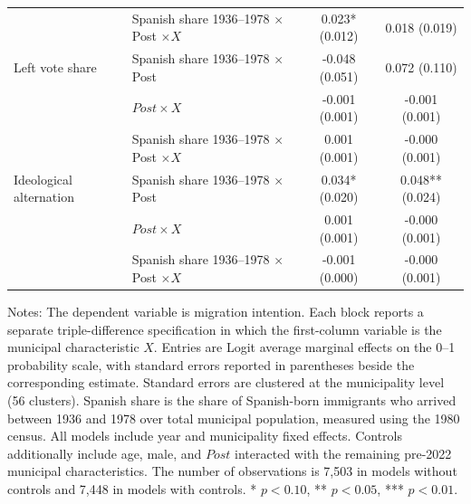 \begin{table}[!htbp]
\begin{tabular}{llcc}
 & Spanish share 1936--1978 \(\times\) Post \(\times X\) & 0.023* (0.012) & 0.018 (0.019) \\
\addlinespace
Left vote share & Spanish share 1936--1978 \(\times\) Post & -0.048 (0.051) & 0.072 (0.110) \\
 & \(Post \times X\) & -0.001 (0.001) & -0.001 (0.001) \\
 & Spanish share 1936--1978 \(\times\) Post \(\times X\) & 0.001 (0.001) & -0.000 (0.001) \\
\addlinespace
Ideological alternation & Spanish share 1936--1978 \(\times\) Post & 0.034* (0.020) & 0.048** (0.024) \\
 & \(Post \times X\) & 0.001 (0.001) & -0.000 (0.001) \\
 & Spanish share 1936--1978 \(\times\) Post \(\times X\) & -0.001 (0.000) & -0.000 (0.001) \\
\hline
\end{tabular}
\par\vspace{1.5mm}
\begin{minipage}{0.98\linewidth}
\footnotesize\setlength{\parindent}{0pt}\setlength{\parskip}{1pt}
Notes: The dependent variable is migration intention. Each block reports a separate triple-difference specification in which the first-column variable is the municipal characteristic \(X\). Entries are Logit average marginal effects on the 0--1 probability scale, with standard errors reported in parentheses beside the corresponding estimate. Standard errors are clustered at the municipality level (56 clusters). Spanish share is the share of Spanish-born immigrants who arrived between 1936 and 1978 over total municipal population, measured using the 1980 census. All models include year and municipality fixed effects. Controls additionally include age, male, and \(Post\) interacted with the remaining pre-2022 municipal characteristics. The number of observations is        7,503 in models without controls and        7,448 in models with controls. * \(p<0.10\), ** \(p<0.05\), *** \(p<0.01\).
\end{minipage}
\end{table}
